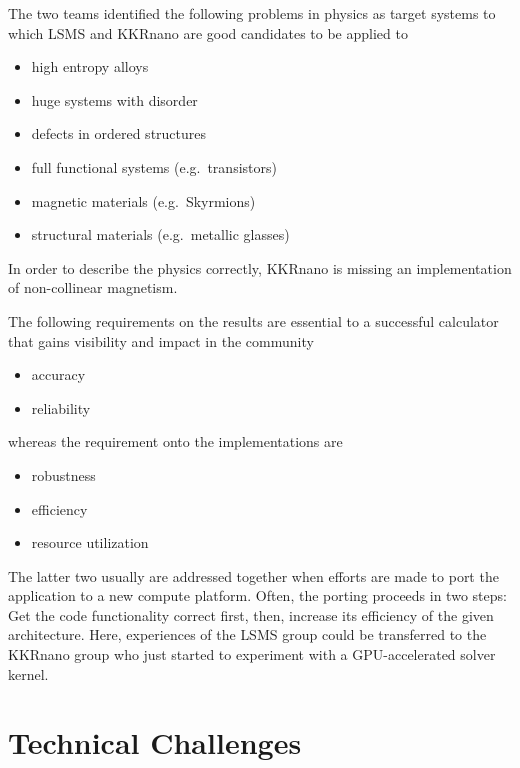 \documentclass{llncs}
\def\KKRnano{{KKRnano}}
\def\LSMS{{LSMS}}
\begin{document}
The two teams identified the following problems in physics as target systems to which \LSMS{} and \KKRnano{}
are good candidates to be applied to
\begin{itemize}
 \item high entropy alloys
 \item huge systems with disorder
 \item defects in ordered structures
 \item full functional systems (e.g.~transistors)
 \item magnetic materials (e.g.~Skyrmions)
 \item structural materials (e.g.~metallic glasses)
\end{itemize}

In order to describe the physics correctly, \KKRnano{} is missing an implementation of non-collinear magnetism.


The following requirements on the results are essential to a successful calculator that gains visibility and impact in the community
\begin{itemize}
 \item accuracy
 \item reliability
\end{itemize}
whereas the requirement onto the implementations are
\begin{itemize}
 \item robustness
 \item efficiency
 \item resource utilization 
\end{itemize}
The latter two usually are addressed together when efforts are made to port the application to a new compute platform.
Often, the porting proceeds in two steps: Get the code functionality correct first, then, increase its efficiency of 
the given architecture. Here, experiences of the \LSMS{} group could be transferred to the \KKRnano{} group who just
started to experiment with a GPU-accelerated solver kernel.

\section{Technical Challenges} \label{section:tech}
\end{document}
